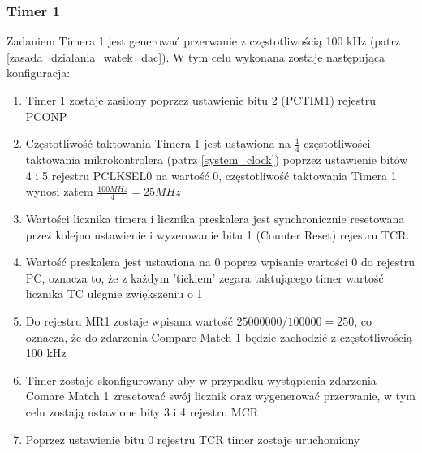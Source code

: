 \subsubsection{Timer 1}
Zadaniem Timera 1 jest generować przerwanie z częstotliwością 100 kHz (patrz \ref{zasada_dzialania_watek_dac}). W tym celu wykonana zostaje następująca konfiguracja:
\begin{enumerate}
    \item Timer 1 zostaje zasilony poprzez ustawienie bitu 2 (PCTIM1) rejestru PCONP
    \item Częstotliwość taktowania Timera 1 jest ustawiona na $\frac{1}{4}$ częstotliwości taktowania mikrokontrolera (patrz \ref{system_clock}) poprzez ustawienie bitów 4 i 5 rejestru PCLKSEL0 na wartość 0, częstotliwość taktowania Timera 1 wynosi zatem $\frac{100MHz}{4} = 25MHz$
    \item Wartości licznika timera i licznika preskalera jest synchronicznie resetowana przez kolejno ustawienie i wyzerowanie bitu 1 (Counter Reset) rejestru TCR.
    \item Wartość preskalera jest ustawiona na 0 poprez wpisanie wartości 0 do rejestru PC, oznacza to, że z każdym 'tickiem' zegara taktującego timer wartość licznika TC ulegnie zwiększeniu o 1
    \item Do rejestru MR1 zostaje wpisana wartość $25000000 / 100000 = 250$, co oznacza, że do zdarzenia Compare Match 1 będzie zachodzić z częstotliwością 100 kHz
    \item Timer zostaje skonfigurowany aby w przypadku wystąpienia zdarzenia Comare Match 1 zresetować swój licznik oraz wygenerować przerwanie, w tym celu zostają ustawione bity 3 i 4 rejestru MCR
    \item Poprzez ustawienie bitu 0 rejestru TCR timer zostaje uruchomiony
\end{enumerate}
